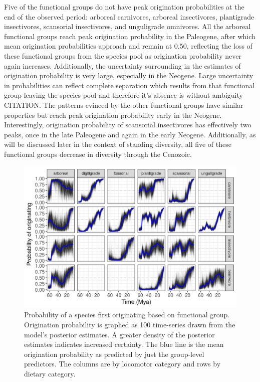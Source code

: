 \documentclass[12pt,letterpaper]{article}
\begin{document}
Five of the functional groups do not have peak origination probabilities at the end of the observed period: arboreal carnivores, arboreal insectivores, plantigrade insectivores, scansorial insectivores, and unguligrade omnivores. All the arboreal functional groups reach peak origination probability in the Paleogene, after which mean origination probabilities approach and remain at 0.50, reflecting the loss of these functional groups from the species pool as origination probability never again increases. Additionally, the uncertainty surrounding in the estimates of origination probability is very large, especially in the Neogene. Large uncertainty in probabilities can reflect complete separation which results from that functional group leaving the species pool and therefore it's absence is without ambiguity CITATION. The patterns evinced by the other functional groups have similar properties but reach peak origination probability early in the Neogene. Interestingly, origination probability of scansorial insectivores has effectively two peaks, once in the late Paleogene and again in the early Neogene. Additionally, as will be discussed later in the context of standing diversity, all five of these functional groups decrease in diversity through the Cenozoic. 
\begin{figure}[ht]
  \centering
  \includegraphics[width=\textwidth,height=0.4\textheight,keepaspectratio=true]{figure/ecotype_origin_bd}
  \caption{Probability of a species first originating based on functional group. Origination probability is graphed as 100 time-series drawn from the model's posterior estimates. A greater density of the posterior estimates indicates increased certainty. The blue line is the mean origination probability as predicted by just the group-level predictors. The columns are by locomotor category and rows by dietary category.}
  \label{fig:eco_origin}
\end{figure}
\end{document}
